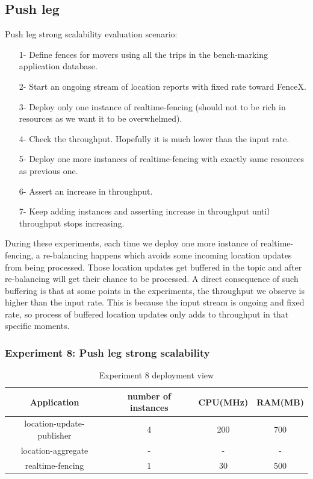 \documentclass[a4]{report}
\begin{document}
    \subsection{Push leg}
    Push leg strong scalability evaluation scenario:
    \begin{itemize}
        \item[1-] Define fences for movers using all the trips in the bench-marking application database.
        \item[2-] Start an ongoing stream of location reports with fixed rate toward FenceX.
        \item[3-] Deploy only one instance of realtime-fencing (should not to be rich in resources as we want it to
        be overwhelmed).
        \item[4-] Check the throughput.
        Hopefully it is much lower than the input rate.
        \item[5-] Deploy one more instances of realtime-fencing with exactly same resources as previous one.
        \item[6-] Assert an increase in throughput.
        \item[7-] Keep adding instances and asserting increase in throughput until throughput stops increasing.
    \end{itemize}

    During these experiments, each time we deploy one more instance of realtime-fencing, a re-balancing happens which
    avoids some incoming location updates from being processed.
    Those location updates get buffered in the topic and after re-balancing will get their chance to be processed.
    A direct consequence of such buffering is that at some points in the experiments, the throughput we observe is
    higher than the input rate.
    This is because the input stream is ongoing and fixed rate, so process of buffered location updates only adds to
    throughput in that specific moments.

    \subsubsection{Experiment 8: Push leg strong scalability}
    \begin{table}[h!]
        \centering
        \begin{tabular}{|c|c|c|c|}
            \hline
            Application               & number of instances & CPU(MHz) & RAM(MB) \\
            \hline
            location-update-publisher & 4                   & 200      & 700     \\
            location-aggregate        & -                   & -        & -       \\
            realtime-fencing          & 1                   & 30       & 500     \\
            \hline
        \end{tabular}
        \caption{Experiment 8 deployment view}
        \label{table:ex8-dv}
    \end{table}
\end{document}
